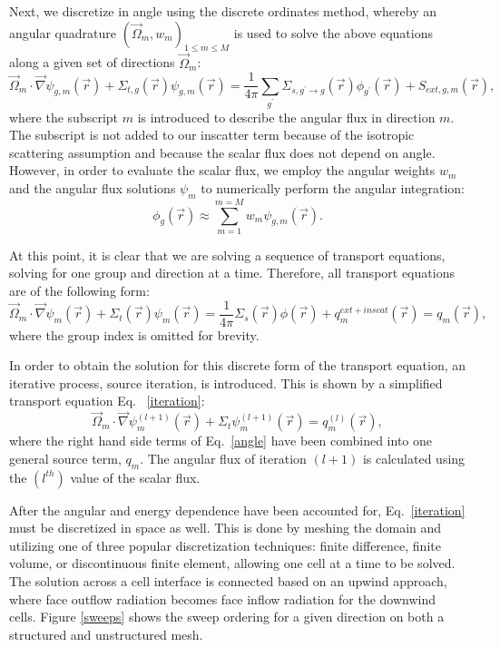 \documentclass[11pt, letterpaper,titlepage,oneside]{article}
\newcommand{\vr}{\vec{r}}
\newcommand{\vo}{\vec{\Omega}}
\begin{document}
Next, we discretize in angle using the discrete ordinates method\cite{denovo}, whereby an angular quadrature $\left( \vo_m, w_m \right)_{1 \le m \le M}$ is used to solve the above equations along a given set of directions $\vo_m$:
\begin{equation}
\vo_m \cdot \vec \nabla \psi_{g,m}(\vr) +\Sigma_{t,g}(\vr) \psi_{g,m}(\vr)  = \frac{1}{4\pi}\sum_{g^{\prime}}\Sigma_{s,g^{\prime}\to g}(\vr)\phi_{g^{\prime}}(\vr) + S_{ext,g,m}(\vr),
\label{angle}
\end{equation}
where the subscript $m$ is introduced to describe the angular flux in direction $m$. The subscript is not added to our inscatter term because of the isotropic scattering assumption and because the scalar flux does not depend on angle. However, in order to evaluate the scalar flux, we employ the angular weights $w_m$ and the angular flux solutions
$\psi_m$ to numerically perform the angular integration:
\begin{equation}
\label{def_scalar_flux_2}
\phi_g(\vr) \approx \sum_{m=1}^{m=M} w_m \psi_{g,m}(\vr).
\end{equation}

At this point, it is clear that we are solving a sequence of transport equations, solving for one group and direction at a time. Therefore, all transport equations are of the following form:
\begin{equation}
\vo_m \cdot \vec \nabla \psi_{m}(\vr) +\Sigma_{t}(\vr) \psi_{m}(\vr)  = \frac{1}{4\pi}\Sigma_{s}(\vr)\phi(\vr) + q^{ext+inscat}_m(\vr) = q_m(\vr),
\end{equation}
where the group index is omitted for brevity.

In order to obtain the solution for this discrete form of the transport equation, an iterative process, source iteration, is introduced. This is shown by a simplified transport equation Eq. ~\eqref{iteration}:
\begin{equation}
\vo_m \cdot \vec\nabla \psi_m^{(l+1)}(\vr) + \Sigma_t \psi_m^{(l+1)}(\vr) = q_m^{(l)}(\vr),
\label{iteration}
\end{equation}
where the right hand side terms of Eq.~\eqref{angle} have been combined into one general source term, $q_m$. The angular flux of iteration $(l+1)$ is calculated using the $(l^{th})$ value of the scalar flux.

After the angular and energy dependence have been accounted for, Eq.~\eqref{iteration} must be discretized in space as well. This is done by meshing the domain and utilizing one of three popular discretization techniques: finite difference\cite{fd}, finite volume\cite{fd}, or discontinuous finite element\cite{Reed}, allowing one cell at a time to be solved. The solution across a cell interface is connected based on an upwind approach, where face outflow radiation becomes face inflow radiation for the downwind cells. Figure \ref{sweeps} shows the sweep ordering for a given direction on both a structured and unstructured mesh.
\end{document}
